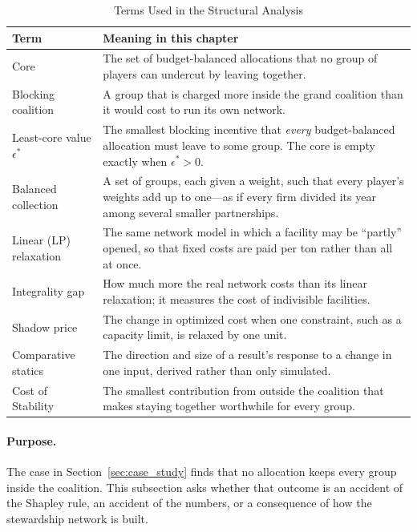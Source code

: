 \begin{table}[htbp]
\centering
\caption{Terms Used in the Structural Analysis}
\label{tab:ch4_glossary}
\small
\begin{tabular}{p{}p{}}
\toprule
\textbf{Term} & \textbf{Meaning in this chapter} \\
\midrule
Core & The set of budget-balanced allocations that no group of players can undercut by leaving together. \\
Blocking coalition & A group that is charged more inside the grand coalition than it would cost to run its own network. \\
Least-core value $\epsilon^*$ & The smallest blocking incentive that \emph{every} budget-balanced allocation must leave to some group. The core is empty exactly when $\epsilon^*>0$. \\
Balanced collection & A set of groups, each given a weight, such that every player's weights add up to one---as if every firm divided its year among several smaller partnerships. \\
Linear (LP) relaxation & The same network model in which a facility may be ``partly'' opened, so that fixed costs are paid per ton rather than all at once. \\
Integrality gap & How much more the real network costs than its linear relaxation; it measures the cost of indivisible facilities. \\
Shadow price & The change in optimized cost when one constraint, such as a capacity limit, is relaxed by one unit. \\
Comparative statics & The direction and size of a result's response to a change in one input, derived rather than only simulated. \\
Cost of Stability & The smallest contribution from outside the coalition that makes staying together worthwhile for every group. \\
\bottomrule
\end{tabular}
\end{table}

\paragraph{Purpose.} The case in Section~\ref{sec:case_study} finds that no allocation keeps every group inside the coalition. This subsection asks whether that outcome is an accident of the Shapley rule, an accident of the numbers, or a consequence of how the stewardship network is built.

